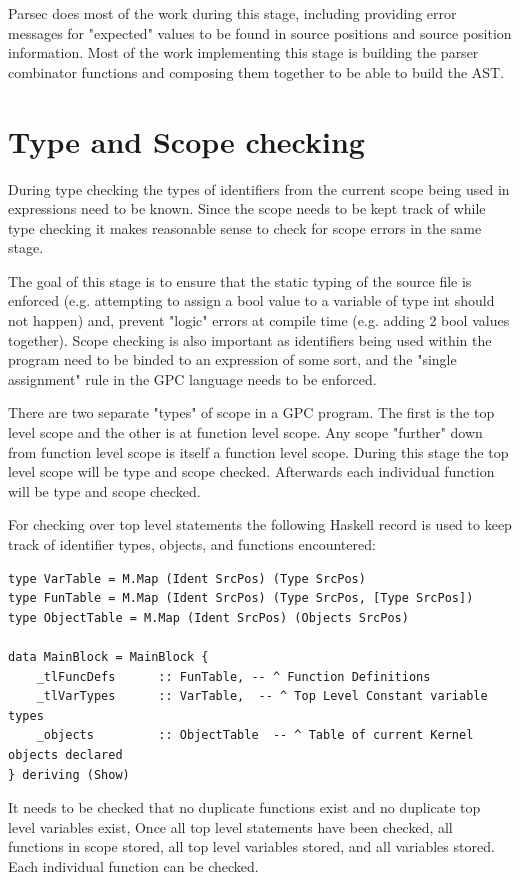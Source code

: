Parsec does most of the work during this stage, including
providing error messages for "expected" values to be found in source
positions and source position information. Most of the work implementing
this stage is building the parser combinator functions and composing
them together to be able to build the AST.


\section{Type and Scope checking}
\label{sec:type}
During type checking the types of identifiers from the current scope being used in expressions need
to be known. Since the scope needs to be kept track of while type checking it makes reasonable
sense to check for scope errors in the same stage.

The goal of this stage is to ensure that the static typing of the source file
is enforced (e.g. attempting to assign a bool value to a variable of type int should not happen) and,
prevent "logic" errors at compile time (e.g. adding 2 bool values together). Scope checking
is also important as identifiers being used within the program need to be binded to an expression of
some sort, and the "single assignment" rule in the GPC language needs to be enforced.

There are two separate "types" of scope in a GPC program. The first is the top level scope and the
other is at function level scope. Any scope "further" down from function level scope is itself
a function level scope. During this stage the top level scope will be type and scope checked.
Afterwards each individual function will be type and scope checked.

For checking over top level statements the following Haskell record is used
to keep track of identifier types, objects, and functions encountered:

\begin{lstlisting}[style=myHaskell]
type VarTable = M.Map (Ident SrcPos) (Type SrcPos)
type FunTable = M.Map (Ident SrcPos) (Type SrcPos, [Type SrcPos])
type ObjectTable = M.Map (Ident SrcPos) (Objects SrcPos)

data MainBlock = MainBlock {
    _tlFuncDefs      :: FunTable, -- ^ Function Definitions
    _tlVarTypes      :: VarTable,  -- ^ Top Level Constant variable types
    _objects         :: ObjectTable  -- ^ Table of current Kernel objects declared 
} deriving (Show)
\end{lstlisting}

It needs to be checked that no duplicate functions exist and  no duplicate top level variables exist,
Once all top level statements have been checked, all functions in scope stored, 
all top level variables stored, and all variables stored. Each individual function
can be checked.

